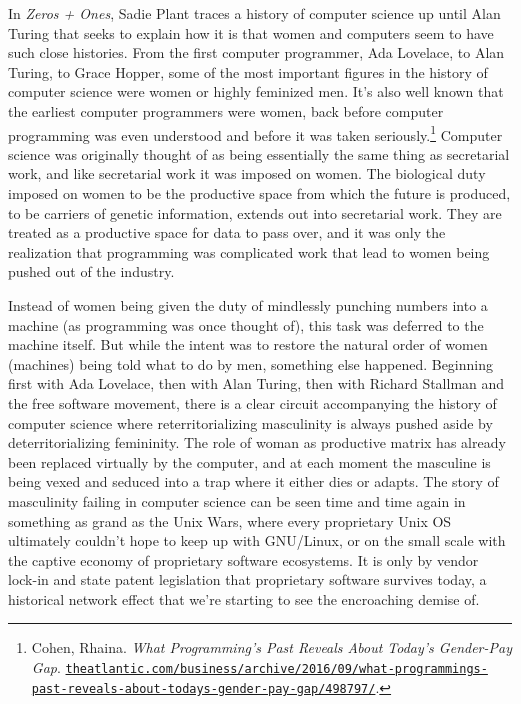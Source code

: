 \documentclass[10pt, statementpaper, twoside, openright]{memoir}
\begin{document}
In \textit{Zeros + Ones}, Sadie Plant traces a history of computer science up until Alan Turing that seeks to explain how it is that women and computers seem to have such close histories. From the first computer programmer, Ada Lovelace, to Alan Turing, to Grace Hopper, some of the most important figures in the history of computer science were women or highly feminized men. It's also well known that the earliest computer programmers were women, back before computer programming was even understood and before it was taken seriously.\footnote{Cohen, Rhaina. \textit{What Programming's Past Reveals About Today's Gender-Pay Gap}. \href{https://www.theatlantic.com/business/archive/2016/09/what-programmings-past-reveals-about-todays-gender-pay-gap/498797/}{\nolinkurl{theatlantic.com/business/archive/2016/09/what-programmings-past-reveals-about-todays-gender-pay-gap/498797/}}.} Computer science was originally thought of as being essentially the same thing as secretarial work, and like secretarial work it was imposed on women. The biological duty imposed on women to be the productive space from which the future is produced, to be carriers of genetic information, extends out into secretarial work. They are treated as a productive space for data to pass over, and it was only the realization that programming was complicated work that lead to women being pushed out of the industry.

Instead of women being given the duty of mindlessly punching numbers into a machine (as programming was once thought of), this task was deferred to the machine itself. But while the intent was to restore the natural order of women (machines) being told what to do by men, something else happened. Beginning first with Ada Lovelace, then with Alan Turing, then with Richard Stallman and the free software movement, there is a clear circuit accompanying the history of computer science where reterritorializing masculinity is always pushed aside by deterritorializing femininity. The role of woman as productive matrix has already been replaced virtually by the computer, and at each moment the masculine is being vexed and seduced into a trap where it either dies or adapts. The story of masculinity failing in computer science can be seen time and time again in something as grand as the Unix Wars, where every proprietary Unix OS ultimately couldn't hope to keep up with GNU/Linux, or on the small scale with the captive economy of proprietary software ecosystems. It is only by vendor lock-in and state patent legislation that proprietary software survives today, a historical network effect that we're starting to see the encroaching demise of.
\end{document}
